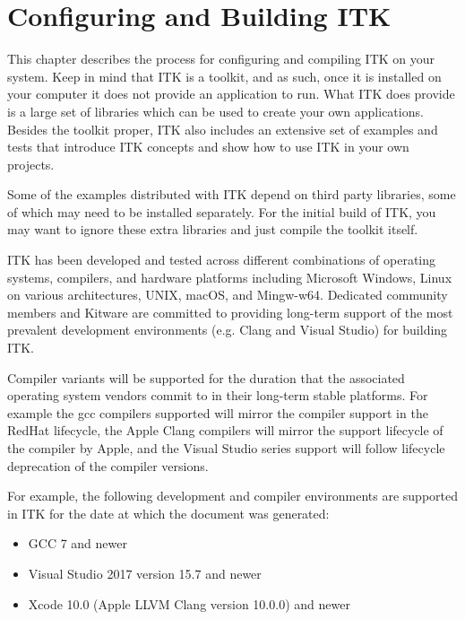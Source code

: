 \chapter{Configuring and Building ITK}
\label{chapter:Installation}

This chapter describes the process for configuring and compiling ITK on your
system. Keep in mind that ITK is a toolkit, and as such, once it is installed
on your computer it does not provide an application to run. What ITK does
provide is a large set of libraries which can be used to create your own
applications. Besides the toolkit proper, ITK also includes an extensive set of
examples and tests that introduce ITK concepts and show how to use ITK in your
own projects.

Some of the examples distributed with ITK depend on third party libraries, some
of which may need to be installed separately. For the initial build of ITK, you
may want to ignore these extra libraries and just compile the toolkit itself.

ITK has been developed and tested across different combinations of operating
systems, compilers, and hardware platforms including Microsoft Windows, Linux on
various architectures, UNIX, macOS, and Mingw-w64. Dedicated community members and
Kitware are committed to providing long-term support of the most prevalent
development environments (e.g. Clang and Visual Studio) for building ITK.

Compiler variants will be supported for the duration that the associated operating
system vendors commit to in their long-term stable platforms. For example the gcc
compilers supported will mirror the compiler support in the RedHat lifecycle, the
Apple Clang compilers will mirror the support lifecycle of the compiler by Apple, and
the Visual Studio series support will follow lifecycle deprecation of the compiler
versions.

For example, the following development and compiler environments are supported
in ITK for the date at which the document was generated:
\begin{itemize}
\item GCC 7 and newer
\item Visual Studio 2017 version 15.7 and newer
\item Xcode 10.0 (Apple LLVM Clang version 10.0.0) and newer
\end{itemize}

